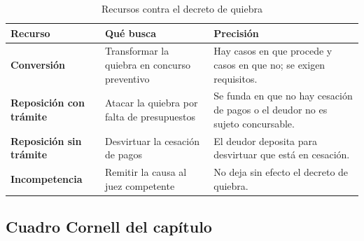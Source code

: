 \documentclass[12pt,oneside]{book}
\begin{document}
\begin{table}[H]
\centering
\small
\caption{Recursos contra el decreto de quiebra}
\begin{tabularx}{\textwidth}{>{\raggedright\arraybackslash}p{} >{\raggedright\arraybackslash}p{} Y}
\toprule
\textbf{Recurso} & \textbf{Qué busca} & \textbf{Precisión} \\
\midrule
\textbf{Conversión} & Transformar la quiebra en concurso preventivo & Hay casos en que procede y casos en que no; se exigen requisitos. \\
\textbf{Reposición con trámite} & Atacar la quiebra por falta de presupuestos & Se funda en que no hay cesación de pagos o el deudor no es sujeto concursable. \\
\textbf{Reposición sin trámite} & Desvirtuar la cesación de pagos & El deudor deposita para desvirtuar que está en cesación. \\
\textbf{Incompetencia} & Remitir la causa al juez competente & No deja sin efecto el decreto de quiebra. \\
\bottomrule
\end{tabularx}
\end{table}

\subsection*{Cuadro Cornell del capítulo}
\end{document}
